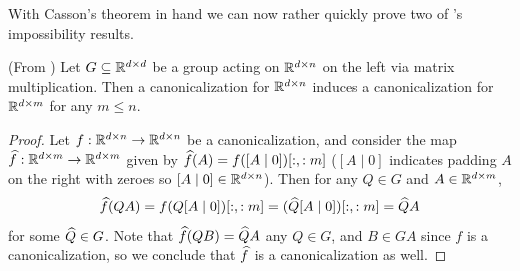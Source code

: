 With Casson's theorem in hand we can now rather quickly prove two of \cite{dym2024equivariant}'s impossibility results.

\begin{lemma}\label{lem:induce-canon-truncate}
    (From \cite{dym2024equivariant})
    Let $G \sub \R^{d \times d}$ be a group acting on $\R^{d \times n}$ on the left via matrix multiplication.
    Then a canonicalization for $\R^{d \times n}$ induces a canonicalization for $\R^{d \times m}$ for any $m \leq n$.
    \begin{proof}
        Let $f : \R^{d \times n} \to \R^{d \times n}$ be a canonicalization, and consider the map $\Hat{f} : \R^{d \times m} \to \R^{d \times m}$ given by $\Hat{f}(A) = f([A \mid 0])[:,:m]$ ($[A \mid 0]$ indicates padding $A$ on the right with zeroes so $[A \mid 0] \in \R^{d \times n}$).
        Then for any $Q \in G$ and $A \in \R^{d \times m}$,
        \[
            \Hat{f}(QA)
            = f(Q[A \mid 0])[:,:m]
            = (\Hat{Q}[A \mid 0])[:,:m]
            = \Hat{Q}A
        \]
    for some $\Hat{Q} \in G$.
    Note that $\Hat{f}(QB) = \Hat{Q}A$ any $Q \in G$, and $B \in GA$ since $f$ is a canonicalization, so we conclude that $\Hat{f}$ is a canonicalization as well.
    \end{proof}
\end{lemma}

